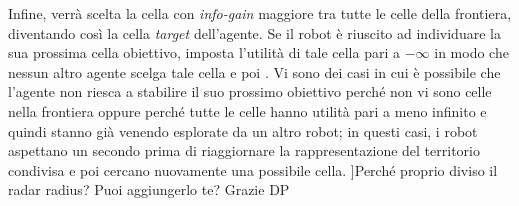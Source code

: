 Infine, verrà scelta la cella con \textit{info-gain} maggiore tra tutte le celle della frontiera, diventando così la cella \textit{target} dell'agente.
Se il robot è riuscito ad individuare la sua prossima cella obiettivo, imposta l'utilità di tale cella pari a $-\infty$ in modo che nessun altro agente scelga tale cella e poi .
Vi sono dei casi in cui è possibile che l'agente non riesca a stabilire il suo prossimo obiettivo perché non vi sono celle nella frontiera oppure perché tutte le celle hanno utilità pari a meno infinito e quindi stanno già venendo esplorate da un altro robot; in questi casi, i robot aspettano un secondo prima di riaggiornare la rappresentazione del territorio condivisa e poi cercano nuovamente una possibile cella.
\todo[inline]]{Perché proprio diviso il radar radius? Puoi aggiungerlo te? Grazie DP}
